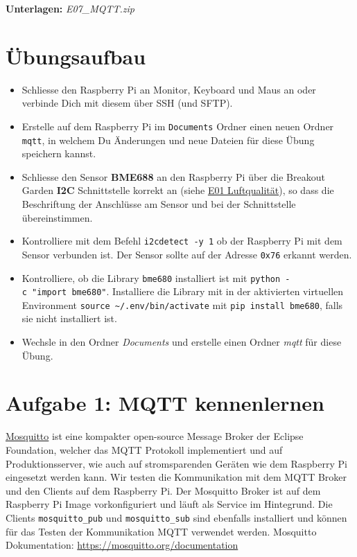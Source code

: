 \documentclass[
  11pt,
  a4paperpaper,
  oneside, openany  ,captions=tableheading
]{scrbook}
\providecommand{\tightlist}{%
  \setlength{\itemsep}{0pt}\setlength{\parskip}{0pt}}
\theoremstyle{definition}
\theoremstyle{remark}
\begin{document}
\textbf{Unterlagen:} \emph{ E07\_MQTT.zip}

\section{Übungsaufbau}\label{uxfcbungsaufbau-6}

\begin{itemize}
\tightlist
\item
  Schliesse den Raspberry Pi an Monitor, Keyboard und Maus an oder
  verbinde Dich mit diesem über SSH (und SFTP).
\item
  Erstelle auf dem Raspberry Pi im \texttt{Documents} Ordner einen neuen
  Ordner \texttt{mqtt}, in welchem Du Änderungen und neue Dateien für
  diese Übung speichern kannst.
\item
  Schliesse den Sensor \textbf{BME688} an den Raspberry Pi über die
  Breakout Garden \textbf{I2C} Schnittstelle korrekt an (siehe
  \href{E01_Luftqualitaet.qmd}{E01 Luftqualität}), so dass die
  Beschriftung der Anschlüsse am Sensor und bei der Schnittstelle
  übereinstimmen.
\item
  Kontrolliere mit dem Befehl \texttt{i2cdetect\ -y\ 1} ob der Raspberry
  Pi mit dem Sensor verbunden ist. Der Sensor sollte auf der Adresse
  \texttt{0x76} erkannt werden.
\item
  Kontrolliere, ob die Library \texttt{bme680} installiert ist mit
  \texttt{python\ -c\ "import\ bme680"}. Installiere die Library mit in
  der aktivierten virtuellen Environment
  \texttt{source\ \textasciitilde{}/.env/bin/activate} mit
  \texttt{pip\ install\ bme680}, falls sie nicht installiert ist.
\item
  Wechsle in den Ordner \emph{Documents} und erstelle einen Ordner
  \emph{mqtt} für diese Übung.
\end{itemize}

\section{Aufgabe 1: MQTT
kennenlernen}\label{aufgabe-1-mqtt-kennenlernen}

\href{https://mosquitto.org}{Mosquitto} ist eine kompakter open-source
Message Broker der Eclipse Foundation, welcher das MQTT Protokoll
implementiert und auf Produktionsserver, wie auch auf stromsparenden
Geräten wie dem Raspberry Pi eingesetzt werden kann. Wir testen die
Kommunikation mit dem MQTT Broker und den Clients auf dem Raspberry Pi.
Der Mosquitto Broker ist auf dem Raspberry Pi Image vorkonfiguriert und
läuft als Service im Hintegrund. Die Clients \texttt{mosquitto\_pub} und
\texttt{mosquitto\_sub} sind ebenfalls installiert und können für das
Testen der Kommunikation MQTT verwendet werden. Mosquitto Dokumentation:
\url{https://mosquitto.org/documentation}
\end{document}
